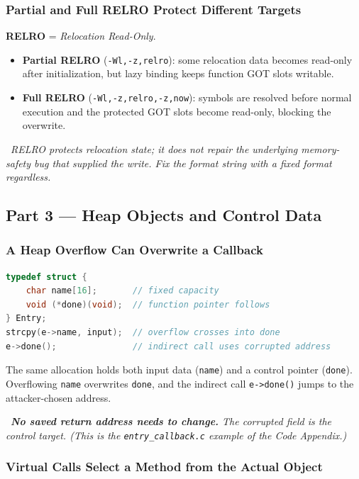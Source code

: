 \documentclass[hidelinks]{article}
\newcommand{\callout}[1]{\par\smallskip\noindent{\color{capri}$\blacktriangleright$}\ \textit{#1}\par\smallskip}
\begin{document}
\subsubsection{Partial and Full RELRO Protect Different Targets}

\textbf{RELRO} = \emph{Relocation Read-Only}.
\begin{itemize}
    \item \textbf{Partial RELRO} (\texttt{-Wl,-z,relro}): some relocation data becomes read-only after initialization, but lazy binding keeps function GOT slots writable.
    \item \textbf{Full RELRO} (\texttt{-Wl,-z,relro,-z,now}): symbols are resolved before normal execution and the protected GOT slots become read-only, blocking the overwrite.
\end{itemize}

\callout{RELRO protects relocation state; it does \emph{not} repair the underlying memory-safety bug that supplied the write. Fix the format string with a fixed format regardless.}

\subsection{Part 3 --- Heap Objects and Control Data}

\subsubsection{A Heap Overflow Can Overwrite a Callback}

\begin{lstlisting}[language=C]
typedef struct {
    char name[16];       // fixed capacity
    void (*done)(void);  // function pointer follows
} Entry;
strcpy(e->name, input);  // overflow crosses into done
e->done();               // indirect call uses corrupted address
\end{lstlisting}
The same allocation holds both input data (\texttt{name}) and a control pointer (\texttt{done}). Overflowing \texttt{name} overwrites \texttt{done}, and the indirect call \texttt{e->done()} jumps to the attacker-chosen address.

\callout{\textbf{No saved return address needs to change.} The corrupted field \emph{is} the control target. (This is the \texttt{entry\_callback.c} example of the Code Appendix.)}

\subsubsection{Virtual Calls Select a Method from the Actual Object}
\end{document}
